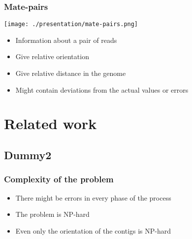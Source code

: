 \documentclass[compress]{beamer}
\begin{document}
  \begin{frame}
    \frametitle{Mate-pairs}
    \begin{multicols}{2}
      \vfill
      \begin{minipage}[c][0.8\textheight][c]{\columnwidth}
        {\texttt{[image: ./presentation/mate-pairs.png]}}
      \end{minipage}
      \vfill
      \columnbreak
      \begin{minipage}[c][0.8\textheight][c]{\columnwidth}
        \begin{itemize}
          \item Information about a pair of reads
          \item Give relative orientation
          \item Give relative distance in the genome
          \item Might contain deviations from the actual values or errors
        \end{itemize}
      \end{minipage}
    \end{multicols}
  \end{frame}

\section{Related work} %
\label{sec:Related work}

\subsection*{Dummy2} %
\label{sub:Dummy2}

  \begin{frame}
    \frametitle{Complexity of the problem}
    \begin{itemize}
      \item There might be errors in every phase of the process
      \item The problem is NP-hard
      \item Even only the orientation of the contigs is NP-hard
    \end{itemize}
  \end{frame}
\end{document}
